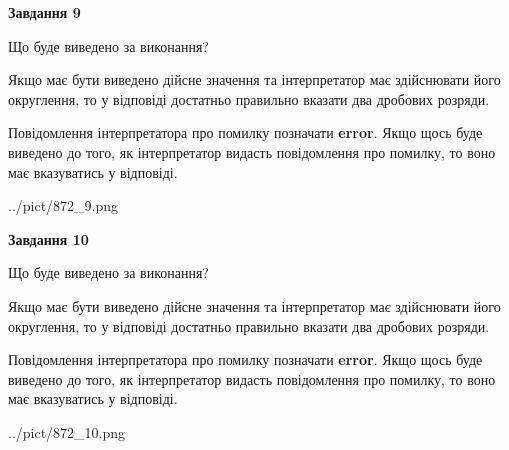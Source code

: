 \documentclass[12pt, ukrainian]{article}
\begin{document}
{\begin {Large}
{\begin {center}\textbf{Завдання 9}\end {center}}\par
Що буде виведено за виконання? \par

Якщо має бути виведено дійсне значення та інтерпретатор має здійснювати його округлення, 
то у відповіді достатньо правильно вказати два дробових розряди.

Повідомлення інтерпретатора про помилку позначати \textbf{error}.
Якщо щось буде виведено до того, як інтерпретатор видасть повідомлення про помилку, 
то воно має вказуватись у відповіді. \par

\begin{center}
	{../pict/872_9.png}
\end{center}
\newpage

{\begin {center}\textbf{Завдання 10}\end {center}}\par
Що буде виведено за виконання? \par

Якщо має бути виведено дійсне значення та інтерпретатор має здійснювати його округлення, 
то у відповіді достатньо правильно вказати два дробових розряди.

Повідомлення інтерпретатора про помилку позначати \textbf{error}.
Якщо щось буде виведено до того, як інтерпретатор видасть повідомлення про помилку, 
то воно має вказуватись у відповіді. \par

\begin{center}
	{../pict/872_10.png}
\end{center}
\newpage

\end {Large}}
\end{document}
